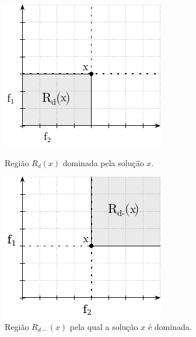 \begin{figure}[!ht]
  \centering
  \begin{minipage}[b]{0.42\textwidth}
    \includegraphics[width=\textwidth]{img/mokp/dom-reg}
    \caption{Região $R_d(x)$ dominada pela solução $x$.}
    \label{img:dom-reg}
  \end{minipage}
  \hfill
  \begin{minipage}[b]{0.42\textwidth}
    \includegraphics[width=\textwidth]{img/mokp/dom-reg-minus}
    \caption{Região $R_{d-}(x)$ pela qual a solução $x$ é dominada.}
    \label{img:dom-reg-minus}
  \end{minipage}
\end{figure}

